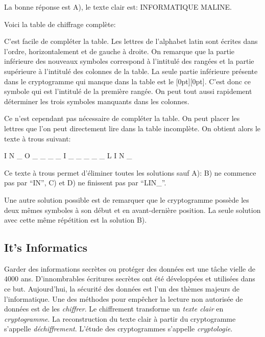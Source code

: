 \documentclass[a4paper,11pt]{report}
\newcommand{\taskGraphicsFolder}{..}
\begin{document}
La bonne réponse est A), le texte clair est: INFORMATIQUE MALINE.

Voici la table de chiffrage complète:

{\centering%
\par}

C’est facile de compléter la table. Les lettres de l’alphabet latin sont écrites dans l’ordre, horizontalement et de gauche à droite. On remarque que la partie inférieure des nouveaux symboles correspond à l’intitulé des rangées et la partie supérieure à l’intitulé des colonnes de la table. La seule partie inférieure présente dans le cryptogramme qui manque dans la table est le \raisebox{-0.5ex}[0pt][0pt]{}. C’est donc ce symbole qui est l’intitulé de la première rangée. On peut tout aussi rapidement déterminer les trois symboles manquants dans les colonnes.

Ce n’est cependant pas nécessaire de compléter la table. On peut placer les lettres que l’on peut directement lire dans la table incomplète. On obtient alors le texte à trous suivant:

I N \_ O \_ \_ \_ \_ I \_ \_ \_ \_ \_ L I N \_

Ce texte à trous permet d’éliminer toutes les solutions sauf A): B) ne commence pas par “IN”, C) et D) ne finissent pas par “LIN\_”.

Une autre solution possible est de remarquer que le cryptogramme possède les deux mêmes symboles à son début et en avant-dernière position. La seule solution avec cette même répétition est la solution B).


\subsection*{It’s Informatics}

Garder des informations secrètes ou protéger des données est une tâche vielle de $4000$ ans. D’innombrables écritures secrètes ont été développées et utilisées dans ce but. Aujourd’hui, la sécurité des données est l’un des thèmes majeurs de l’informatique. Une des méthodes pour empêcher la lecture non autorisée de données est de les \emph{chiffrer}. Le chiffrement transforme un \emph{texte clair} en \emph{cryptogramme}. La reconstruction du texte clair à partir du cryptogramme s’appelle \emph{déchiffrement}. L’étude des cryptogrammes s’appelle \emph{cryptologie}.
\end{document}
